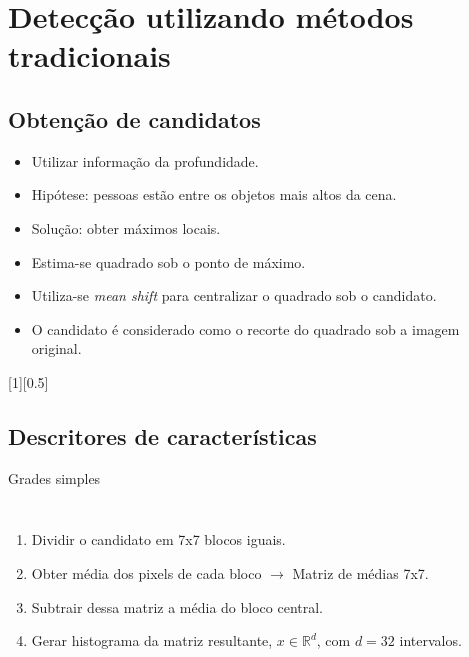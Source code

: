\section{Detecção utilizando métodos tradicionais}

\subsection{Obtenção de candidatos}
	\begin{frame}{\insertsubsection}
		\begin{itemize}
		\item<1-> Utilizar informação da profundidade.
		\item<2-> Hipótese: pessoas estão entre os objetos mais altos da cena.
		\item<2-> Solução: obter máximos locais.
		\end{itemize}

	\end{frame}

	\begin{frame}{\insertsubsection}
		\begin{itemize}
		\item Estima-se quadrado sob o ponto de máximo.
		\item Utiliza-se \emph{mean shift} para centralizar o quadrado sob o candidato.
		\item O candidato é considerado como o recorte do quadrado sob a imagem original.
		\end{itemize}
		[1][0.5]
	\end{frame}

\subsection{Descritores de características}
	\begin{frame}{Grades simples}
		\begin{columns}
		\begin{enumerate}
			\item Dividir o candidato em 7x7 blocos iguais.
			\item Obter média dos pixels de cada bloco $\rightarrow$ Matriz de médias 7x7.
			\item Subtrair dessa matriz a média do bloco central.
			\item Gerar histograma da matriz resultante, $x \in \mathbb{R}^d$, com $d=32$ intervalos.
		\end{enumerate}
		\end{columns}
	\end{frame}

